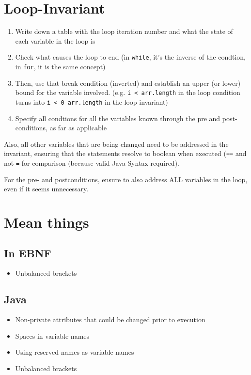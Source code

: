 \documentclass{article}
\begin{document}
\startDocument
\usetcolorboxes






\section{Loop-Invariant}
\begin{enumerate}
    \item Write down a table with the loop iteration number and what the state of each variable in the loop is
    \item Check what causes the loop to end (in \texttt{while}, it's the inverse of the condtion, in \texttt{for}, it is the same concept)
    \item Then, use that break condition (inverted) and establish an upper (or lower) bound for the variable involved. (e.g. \texttt{i < arr.length} in the loop condition turns into \texttt{i < 0 arr.length} in the loop invariant)
    \item Specify all condtions for all the variables known through the pre and post-conditions, as far as applicable
\end{enumerate}

Also, all other variables that are being changed need to be addressed in the invariant, ensuring that the statements resolve to boolean when executed (\texttt{==} and not \texttt{=} for comparison (because valid Java Syntax required).

For the pre- and postconditions, ensure to also address ALL variables in the loop, even if it seems unnecessary.


\section{Mean things}
\subsection{In EBNF}
\begin{itemize}
    \item Unbalanced brackets
\end{itemize}

\subsection{Java}
\begin{itemize}
    \item Non-private attributes that could be changed prior to execution
    \item Spaces in variable names
    \item Using reserved names as variable names
    \item Unbalanced brackets
\end{itemize}
\end{document}
